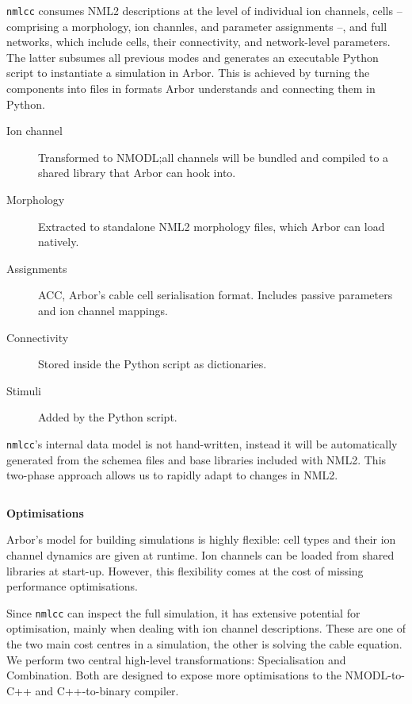 \documentclass{beamer}
\begin{document}
\begin{frame}[t, fragile]
\begin{columns}
\begin{column}{0.49\textwidth}
      \texttt{nmlcc} consumes NML2 descriptions at the level of individual ion
      channels, cells -- comprising a morphology, ion channles, and parameter
      assignments --, and full networks, which include cells, their
      connectivity, and network-level parameters. The latter subsumes all
      previous modes and generates an executable Python script to instantiate a
      simulation in Arbor. This is achieved by turning the components into files
      in formats Arbor understands and connecting them in Python.
      \begin{description}
        \item[Ion channel] Transformed to NMODL;\@ all channels will be bundled and compiled to a
        shared library that Arbor can hook into.
        \item[Morphology] Extracted to standalone NML2 morphology files, which Arbor can
        load natively.
        \item[Assignments] ACC, Arbor's cable cell serialisation format.
              Includes passive parameters and ion channel mappings.
        \item[Connectivity] Stored inside the Python script as dictionaries.
        \item[Stimuli] Added by the Python script.
      \end{description}

      \texttt{nmlcc}'s internal data model is not hand-written, instead it will
      be automatically generated from the schemea files and base libraries
      included with NML2. This two-phase approach allows us to rapidly adapt to
      changes in NML2.
    \end{column}
  \end{columns}
  \vspace*{2ex}
  \begin{columns}
    \begin{column}{0.49\textwidth}
      \textbf{Optimisations}

      Arbor's model for building simulations is highly flexible: cell types and
      their ion channel dynamics are given at runtime. Ion channels can be
      loaded from shared libraries at start-up. However, this flexibility comes
      at the cost of missing performance optimisations.

      Since \texttt{nmlcc} can inspect the full simulation, it has extensive
      potential for optimisation, mainly when dealing with ion channel
      descriptions. These are one of the two main cost centres in a simulation,
      the other is solving the cable equation. We perform two central high-level
      transformations: Specialisation and Combination. Both are designed to
      expose more optimisations to the NMODL-to-C++ and C++-to-binary compiler.


\end{column}
\end{columns}
\end{frame}
\end{document}
